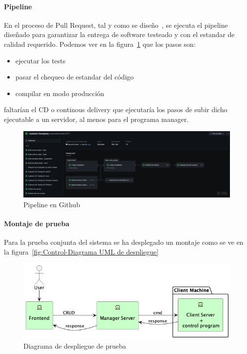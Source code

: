 
\paragraph{Pipeline}\label{par:pipeline}

En el proceso de Pull Request, tal y como se diseño~, se ejecuta el pipeline diseñado para garantizar la entrega de software testeado y con el estandar de calidad requerido. Podemos ver en la figura~\cref{fig:githubActions} que los pasos son:

\begin{itemize}
    \item ejecutar los tests
    \item pasar el chequeo de estandar del código
    \item compilar en modo producción
\end{itemize}

faltarían el CD o continous delivery que ejecutaría los pasos de subir dicho ejecutable a un servidor, al menos para el programa manager.

\begin{figure}[H]
    \centering
    \includegraphics[height=0.2\textheight]{./part/Ejecucion/Seguimiento/PuestaAPunto/img/githubPipelines}
    \caption{Pipeline en Github}\label{fig:githubActions}
\end{figure}

\paragraph{Montaje de prueba}\label{par:montaje}

Para la prueba conjunta del sistema se ha desplegado un montaje como se ve en la figura~\cref{fig:Control-Diagrama UML de despliegue}

\begin{figure}[H]
    \centering
    \includegraphics[height=0.2\textheight]{./part/Ejecucion/Seguimiento/PuestaAPunto/img/deploy}
    \caption{Diagrama de despliegue de prueba}\label{fig:despliegue de prueba}
\end{figure}

